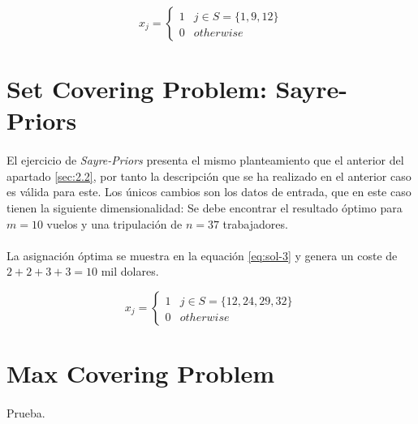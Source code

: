 \documentclass[spanish]{article}
\begin{document}
			\begin{equation}
			\label{eq:sol-2.2}
				x_{j} =
					\begin{cases}
		      	1 & j \in S = \{ 1, 9, 12  \} \\
		      	0 & otherwise
			   	\end{cases}
			\end{equation}


	\section{Set Covering Problem: Sayre-Priors}
	\label{sec:3}

		\paragraph{}
		El ejercicio de \emph{Sayre-Priors} presenta el mismo planteamiento que el anterior del apartado \ref{sec:2.2}, por tanto la descripción que se ha realizado en el anterior caso es válida para este. Los únicos cambios son los datos de entrada, que en este caso tienen la siguiente dimensionalidad: Se debe encontrar el resultado óptimo para $m = 10$ vuelos y una tripulación de $n = 37$ trabajadores.

		\paragraph{}
		La asignación óptima se muestra en la equación \eqref{eq:sol-3} y genera un coste de $2 + 2 + 3 + 3 = 10 $ mil dolares.

\begin{equation}
		\label{eq:sol-3}
			x_{j} =
				\begin{cases}
					1 & j \in S = \{ 12, 24, 29, 32  \} \\
					0 & otherwise
				\end{cases}
		\end{equation}


	\section{Max Covering Problem}
	\label{sec:4}

		\paragraph{}
		Prueba.
\end{document}
